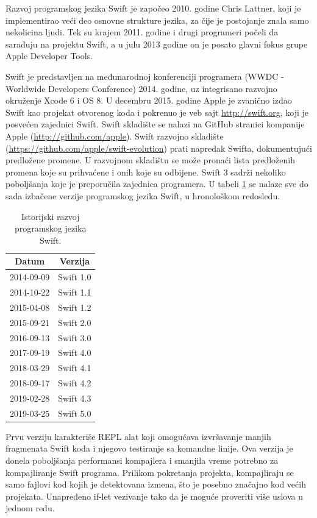 \documentclass[a4paper]{article}
\begin{document}
Razvoj programskog jezika Swift je započeo 2010. godine Chris Lattner, koji je implementirao veći deo osnovne strukture jezika, za čije je postojanje znala samo nekolicina ljudi. Tek su krajem 2011. godine i drugi programeri počeli da sarađuju na projektu Swift, a u julu 2013 godine on je posato glavni fokus grupe Apple Developer Tools. 

Swift je predstavljen na međunarodnoj konferenciji programera (WWDC - Worldwide Developers Conference) 2014. godine, uz integrisano razvojno okruženje Xcode 6 i OS 8. U decembru 2015. godine Apple je zvanično izdao Swift kao projekat otvorenog koda i pokrenuo je veb sajt \url{http://swift.org}, koji je posvećen zajednici Swift. Swift skladište se nalazi na GitHub stranici kompanije Apple (\url{http://github.com/apple}). Swift razvojno skladište (\url{https://github.com/apple/swift-evolution}) prati napredak Swifta, dokumentujući predložene promene. U razvojnom skladištu se može pronaći lista predloženih promena koje su prihvaćene i onih koje su odbijene. Swift 3 sadrži nekoliko poboljšanja koje je preporučila zajednica programera. U tabeli \ref{tab:tabela1} se nalaze sve do sada izbačene verzije programskog jezika Swift, u hronološkom redosledu.

\begin{table}[h!]
\begin{center}
\caption{Istorijski razvoj programskog jezika Swift.}
\begin{tabular}{|c|c|} \hline
\label{tab:tabela1}
Datum & Verzija \\ \hline
2014-09-09 & Swift 1.0 \\ \hline
2014-10-22 & Swift 1.1 \\ \hline
2015-04-08 & Swift 1.2 \\ \hline
2015-09-21 & Swift 2.0 \\ \hline
2016-09-13 & Swift 3.0 \\ \hline
2017-09-19 & Swift 4.0 \\ \hline
2018-03-29 & Swift 4.1 \\ \hline
2018-09-17 & Swift 4.2 \\ \hline
2019-02-28 & Swift 4.3 \\ \hline
2019-03-25 & Swift 5.0 \\ \hline
\end{tabular}
\end{center}
\end{table}

Prvu verziju karakteriše REPL alat koji omogućava izvršavanje  manjih fragmenata Swift koda i njegovo testiranje sa komandne linije. Ova verzija je donela poboljšanja performansi kompajlera i smanjila vreme potrebno za kompajliranje Swift programa. Prilikom pokretanja projekta, kompajliraju se samo fajlovi kod kojih je detektovana izmena, što je posebno značajno kod većih projekata. Unapređeno if-let vezivanje tako da je moguće proveriti više uslova u jednom redu.
\end{document}
